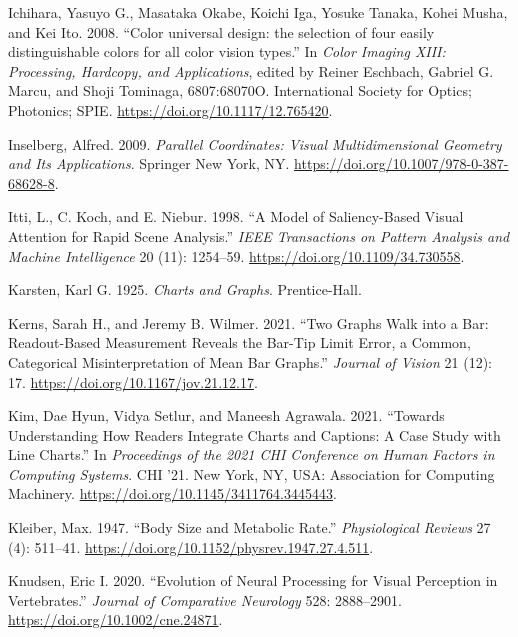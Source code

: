 \documentclass[
  letterpaper,
  DIV=11,
  numbers=noendperiod]{scrreprt}
\newlength{\cslhangindent}
\newenvironment{CSLReferences}[2] %
 {\begin{list}{}{%
  \setlength{\itemindent}{0pt}
  \setlength{\leftmargin}{0pt}
  \setlength{\parsep}{0pt}
  \ifodd #1
   \setlength{\leftmargin}{\cslhangindent}
   \setlength{\itemindent}{-1\cslhangindent}
  \fi
  \setlength{\itemsep}{#2\baselineskip}}}
 {\end{list}}
\begin{document}
\begin{CSLReferences}{1}{0}
Ichihara, Yasuyo G., Masataka Okabe, Koichi Iga, Yosuke Tanaka, Kohei
Musha, and Kei Ito. 2008. {``{Color universal design: the selection of
four easily distinguishable colors for all color vision types}.''} In
\emph{Color Imaging XIII: Processing, Hardcopy, and Applications},
edited by Reiner Eschbach, Gabriel G. Marcu, and Shoji Tominaga,
6807:68070O. International Society for Optics; Photonics; SPIE.
\url{https://doi.org/10.1117/12.765420}.

Inselberg, Alfred. 2009. \emph{Parallel Coordinates: Visual
Multidimensional Geometry and Its Applications}. Springer New York, NY.
\url{https://doi.org/10.1007/978-0-387-68628-8}.

Itti, L., C. Koch, and E. Niebur. 1998. {``A Model of Saliency-Based
Visual Attention for Rapid Scene Analysis.''} \emph{IEEE Transactions on
Pattern Analysis and Machine Intelligence} 20 (11): 1254--59.
\url{https://doi.org/10.1109/34.730558}.

Karsten, Karl G. 1925. \emph{Charts and Graphs}. Prentice-Hall.

Kerns, Sarah H., and Jeremy B. Wilmer. 2021. {``Two Graphs Walk into a
Bar: Readout-Based Measurement Reveals the Bar-Tip Limit Error, a
Common, Categorical Misinterpretation of Mean Bar Graphs.''}
\emph{Journal of Vision} 21 (12): 17.
\url{https://doi.org/10.1167/jov.21.12.17}.

Kim, Dae Hyun, Vidya Setlur, and Maneesh Agrawala. 2021. {``Towards
Understanding How Readers Integrate Charts and Captions: A Case Study
with Line Charts.''} In \emph{Proceedings of the 2021 CHI Conference on
Human Factors in Computing Systems}. CHI '21. New York, NY, USA:
Association for Computing Machinery.
\url{https://doi.org/10.1145/3411764.3445443}.

Kleiber, Max. 1947. {``Body Size and Metabolic Rate.''}
\emph{Physiological Reviews} 27 (4): 511--41.
\url{https://doi.org/10.1152/physrev.1947.27.4.511}.

Knudsen, Eric I. 2020. {``Evolution of Neural Processing for Visual
Perception in Vertebrates.''} \emph{Journal of Comparative Neurology}
528: 2888--2901. \url{https://doi.org/10.1002/cne.24871}.


\end{CSLReferences}
\end{document}
